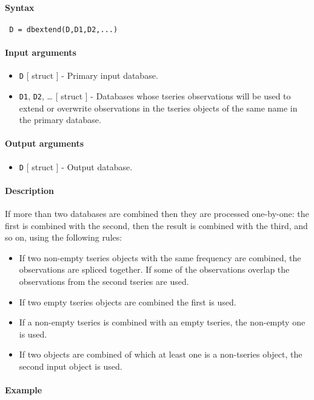 


	\paragraph{Syntax}
 
 \begin{verbatim}
 D = dbextend(D,D1,D2,...)
 \end{verbatim}
 
 \paragraph{Input arguments}
 
 \begin{itemize}
 \item
   \texttt{D} {[} struct {]} - Primary input database.
 \item
   \texttt{D1}, \texttt{D2}, \ldots{} {[} struct {]} - Databases whose
   tseries observations will be used to extend or overwrite observations
   in the tseries objects of the same name in the primary database.
 \end{itemize}
 
 \paragraph{Output arguments}
 
 \begin{itemize}
 \item
   \texttt{D} {[} struct {]} - Output database.
 \end{itemize}
 
 \paragraph{Description}
 
 If more than two databases are combined then they are processed
 one-by-one: the first is combined with the second, then the result is
 combined with the third, and so on, using the following rules:
 
 \begin{itemize}
 \item
   If two non-empty tseries objects with the same frequency are combined,
   the observations are spliced together. If some of the observations
   overlap the observations from the second tseries are used.
 \item
   If two empty tseries objects are combined the first is used.
 \item
   If a non-empty tseries is combined with an empty tseries, the
   non-empty one is used.
 \item
   If two objects are combined of which at least one is a non-tseries
   object, the second input object is used.
 \end{itemize}
 
 \paragraph{Example}


